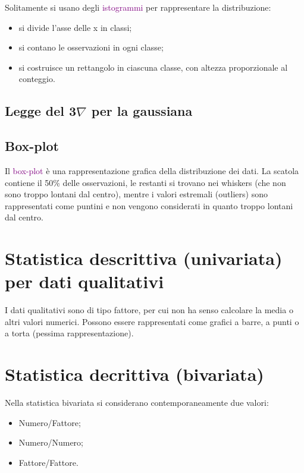 Solitamente si usano degli \textcolor{purple}{istogrammi} per rappresentare la distribuzione:

\begin{itemize}
    \item si divide l'asse delle x in classi;
    \item si contano le osservazioni in ogni classe;
    \item si costruisce un rettangolo in ciascuna classe, con altezza proporzionale al conteggio.
\end{itemize}

\subsection{Legge del 3\texorpdfstring{$\nabla$}- per la gaussiana}


\subsection{Box-plot}

Il \textcolor{purple}{box-plot} è una rappresentazione grafica della distribuzione dei dati. La scatola contiene il 50\% delle osservazioni, le restanti si trovano nei whiskers (che non sono troppo lontani dal centro), mentre i valori estremali (outliers) sono rappresentati come puntini e non vengono considerati in quanto troppo lontani dal centro.

\section{Statistica descrittiva (univariata) per dati qualitativi}

I dati qualitativi sono di tipo fattore, per cui non ha senso calcolare la media o altri valori numerici. Possono essere rappresentati come grafici a barre, a punti o a torta (pessima rappresentazione).

\section{Statistica decrittiva (bivariata)}

Nella statistica bivariata si considerano contemporaneamente due valori:

\begin{itemize}
    \item Numero/Fattore;
    \item Numero/Numero;
    \item Fattore/Fattore.
\end{itemize}
